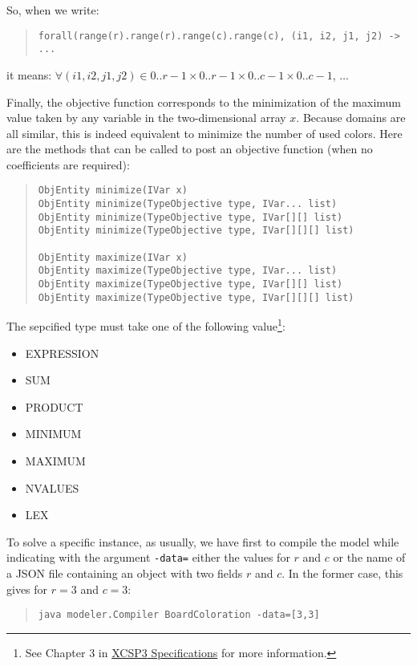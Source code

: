 \documentclass[10pt]{article}
\def\xt{{\rm XCSP3}\xspace}
\def\xt{{\rm XCSP3}\xspace}
\begin{document}
So, when we write:
\begin{quote}
\begin{verbatim}
forall(range(r).range(r).range(c).range(c), (i1, i2, j1, j2) -> ...
\end{verbatim}
\end{quote}
it means: $\forall (i1,i2,j1,j2) \in 0..r-1 \times 0..r-1 \times 0..c-1 \times 0..c-1$, $\dots$

\bigskip
Finally, the objective function corresponds to the minimization of the maximum value taken by any variable in the two-dimensional array $x$.
Because domains are all similar, this is indeed equivalent to minimize the number of used colors.
Here are the methods that can be called to post an objective function (when no coefficients are required):

\begin{quote}
\begin{verbatim}
ObjEntity minimize(IVar x) 
ObjEntity minimize(TypeObjective type, IVar... list) 
ObjEntity minimize(TypeObjective type, IVar[][] list) 
ObjEntity minimize(TypeObjective type, IVar[][][] list) 

ObjEntity maximize(IVar x) 
ObjEntity maximize(TypeObjective type, IVar... list) 
ObjEntity maximize(TypeObjective type, IVar[][] list) 
ObjEntity maximize(TypeObjective type, IVar[][][] list) 
\end{verbatim}
\end{quote}

The sepcified type must take one of the following value\footnote{See Chapter 3 in \href{http://www.xcsp.org/format3.pdf}{\xt Specifications} for more information.}:
\begin{itemize}
\item EXPRESSION
\item SUM
\item PRODUCT
\item MINIMUM
\item MAXIMUM
\item NVALUES
\item LEX
\end{itemize}


\bigskip
To solve a specific instance, as usually, we have first to compile the model while indicating with the argument \verb!-data=! either the values for $r$ and $c$ or the name of a JSON file containing an object with two fields $r$ and $c$.
In the former case, this gives for $r=3$ and $c=3$: 
\begin{quote}
\begin{verbatim}
java modeler.Compiler BoardColoration -data=[3,3]
\end{verbatim}
\end{quote}
\end{document}
